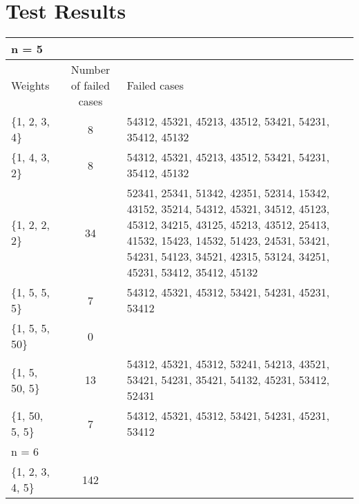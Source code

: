 \documentclass{article}
\begin{document}
\section{Test Results}
\begin{table}[ht]
  \centering
  \begin{tabularx}{\linewidth}{lcX}
  \toprule
  \multicolumn{3}{l}{n = 5} \\
  \midrule
  Weights & Number of failed cases & Failed cases  \\
  \midrule
  \{1, 2, 3, 4\} & 8 &  54312, 45321, 45213, 43512, 53421, 54231, 35412, 45132\\
  \{1, 4, 3, 2\} & 8 &  54312, 45321, 45213, 43512, 53421, 54231, 35412, 45132 \\
  \{1, 2, 2, 2\} & 34 & 52341, 25341, 51342, 42351, 52314, 15342, 43152, 35214, 54312, 45321, 34512, 45123, 45312, 34215, 43125, 45213, 43512, 25413, 41532, 15423, 14532, 51423, 24531, 53421, 54231, 54123, 34521, 42315, 53124, 34251, 45231, 53412, 35412, 45132 \\
  \{1, 5, 5, 5\} & 7 & 54312, 45321, 45312, 53421, 54231, 45231, 53412 \\
  \{1, 5, 5, 50\} & 0 & \\
  \{1, 5, 50, 5\} & 13 & 54312, 45321, 45312, 53241, 54213, 43521, 53421, 54231, 35421, 54132, 45231, 53412, 52431 \\
  \{1, 50, 5, 5\} & 7  & 54312, 45321, 45312, 53421, 54231, 45231, 53412 \\
  \midrule
  \multicolumn{3}{l}{n = 6} \\
  \midrule
  \{1, 2, 3, 4, 5\} & 142 & \\

  \end{tabularx}
\end{table}

\clearpage


\end{document}
